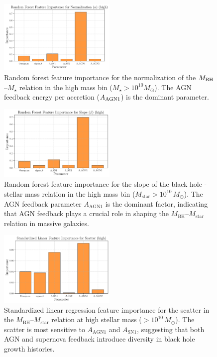 \documentclass[twocolumn]{aastex631}
\begin{document}
\begin{figure}[ht!]
    \centering
    \includegraphics[width=0.5\textwidth]{../Project5/plots/featimp_RandomForest_Normalization_alpha_high_114_20250423_182619.png}
    \caption{Random forest feature importance for the normalization of the $M_{\rm BH}$–$M_{\star}$ relation in the high mass bin ($M_{\star} > 10^{10} M_\odot$). The AGN feedback energy per accretion ($A_{\rm AGN1}$) is the dominant parameter.
}
    \label{fig:featimp_norm_high}
\end{figure}

\begin{figure}[ht!]
    \centering
    \includegraphics[width=0.5\textwidth]{../Project5/plots/featimp_RandomForest_Slope_beta_high_111_20250423_182617.png}
    \caption{Random forest feature importance for the slope of the black hole - stellar mass relation in the high mass bin ($M_\mathrm{star}>10^{10}\,M_\odot$). The AGN feedback parameter $A_\mathrm{AGN1}$ is the dominant factor, indicating that AGN feedback plays a crucial role in shaping the $M_\mathrm{BH}$–$M_\mathrm{star}$ relation in massive galaxies.
}
    \label{fig:featimp_slope_random_high}
\end{figure}

\begin{figure}[ht!]
    \centering
    \includegraphics[width=0.5\textwidth]{../Project5/plots/featimp_StandardizedLinear_Scatter_high_118_20250423_182621.png}
    \caption{Standardized linear regression feature importance for the scatter in the $M_\mathrm{BH}$–$M_\mathrm{star}$ relation at high stellar mass ($>10^{10}\,M_\odot$). The scatter is most sensitive to $A_\mathrm{AGN1}$ and $A_\mathrm{SN1}$, suggesting that both AGN and supernova feedback introduce diversity in black hole growth histories.
}
    \label{fig:featimp_scatter_linear_high}
\end{figure}
\end{document}
